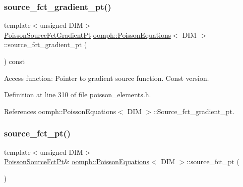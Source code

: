 \subsubsection{\texorpdfstring{source\+\_\+fct\+\_\+gradient\+\_\+pt()}{source\_fct\_gradient\_pt()}\hspace{0.1cm}{\footnotesize\ttfamily [2/2]}}
{\footnotesize\ttfamily template$<$unsigned D\+IM$>$ \\
\hyperlink{classoomph_1_1PoissonEquations_a6182c46eb07d6219d6f939f0962724c4}{Poisson\+Source\+Fct\+Gradient\+Pt} \hyperlink{classoomph_1_1PoissonEquations}{oomph\+::\+Poisson\+Equations}$<$ D\+IM $>$\+::source\+\_\+fct\+\_\+gradient\+\_\+pt (\begin{DoxyParamCaption}{ }\end{DoxyParamCaption}) const\hspace{0.3cm}{\ttfamily [inline]}}



Access function\+: Pointer to gradient source function. Const version. 



Definition at line 310 of file poisson\+\_\+elements.\+h.



References oomph\+::\+Poisson\+Equations$<$ D\+I\+M $>$\+::\+Source\+\_\+fct\+\_\+gradient\+\_\+pt.

\mbox{\label{classoomph_1_1PoissonEquations_aeeffc9c64ab0be478d2fe1d6e9d0f959}} 
\subsubsection{\texorpdfstring{source\+\_\+fct\+\_\+pt()}{source\_fct\_pt()}\hspace{0.1cm}{\footnotesize\ttfamily [1/2]}}
{\footnotesize\ttfamily template$<$unsigned D\+IM$>$ \\
\hyperlink{classoomph_1_1PoissonEquations_a1e3a857c1f506c99d437fb932a24c828}{Poisson\+Source\+Fct\+Pt}\& \hyperlink{classoomph_1_1PoissonEquations}{oomph\+::\+Poisson\+Equations}$<$ D\+IM $>$\+::source\+\_\+fct\+\_\+pt (\begin{DoxyParamCaption}{ }\end{DoxyParamCaption})\hspace{0.3cm}{\ttfamily [inline]}}



